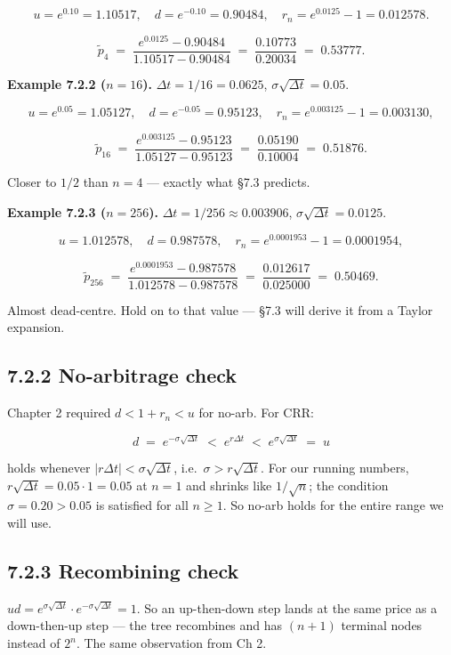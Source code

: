 \documentclass[
  10pt,
  twoside]{book}
\begin{document}
\[u = e^{0.10} = 1.10517, \quad d = e^{-0.10} = 0.90484, \quad r_n = e^{0.0125} - 1 = 0.012578.\]

\[\tilde p_4 \;=\; \frac{e^{0.0125} - 0.90484}{1.10517 - 0.90484} \;=\; \frac{0.10773}{0.20034} \;=\; 0.53777.\]

\textbf{Example 7.2.2 (\(n=16\)).} \(\Delta t = 1/16 = 0.0625\),
\(\sigma\sqrt{\Delta t} = 0.05\).

\[u = e^{0.05} = 1.05127, \quad d = e^{-0.05} = 0.95123, \quad r_n = e^{0.003125} - 1 = 0.003130,\]

\[\tilde p_{16} \;=\; \frac{e^{0.003125} - 0.95123}{1.05127 - 0.95123} \;=\; \frac{0.05190}{0.10004} \;=\; 0.51876.\]

Closer to \(1/2\) than \(n=4\) --- exactly what §7.3 predicts.

\textbf{Example 7.2.3 (\(n=256\)).}
\(\Delta t = 1/256 \approx 0.003906\),
\(\sigma\sqrt{\Delta t} = 0.0125\).

\[u = 1.012578, \quad d = 0.987578, \quad r_n = e^{0.0001953} - 1 = 0.0001954,\]

\[\tilde p_{256} \;=\; \frac{e^{0.0001953} - 0.987578}{1.012578 - 0.987578} \;=\; \frac{0.012617}{0.025000} \;=\; 0.50469.\]

Almost dead-centre. Hold on to that value --- §7.3 will derive it from a
Taylor expansion.

\subsection{7.2.2 No-arbitrage check}\label{no-arbitrage-check}

Chapter 2 required \(d < 1 + r_n < u\) for no-arb. For CRR:

\[d \;=\; e^{-\sigma\sqrt{\Delta t}} \;<\; e^{r\Delta t} \;<\; e^{\sigma\sqrt{\Delta t}} \;=\; u\]

holds whenever \(|r\Delta t| < \sigma\sqrt{\Delta t}\),
i.e.~\(\sigma > r\sqrt{\Delta t}\). For our running numbers,
\(r\sqrt{\Delta t} = 0.05 \cdot 1 = 0.05\) at \(n=1\) and shrinks like
\(1/\sqrt n\); the condition \(\sigma = 0.20 > 0.05\) is satisfied for
all \(n \ge 1\). So no-arb holds for the entire range we will use.

\subsection{7.2.3 Recombining check}\label{recombining-check}

\(ud = e^{\sigma\sqrt{\Delta t}} \cdot e^{-\sigma\sqrt{\Delta t}} = 1\).
So an up-then-down step lands at the same price as a down-then-up step
--- the tree recombines and has \((n+1)\) terminal nodes instead of
\(2^n\). The same observation from Ch 2.
\end{document}
